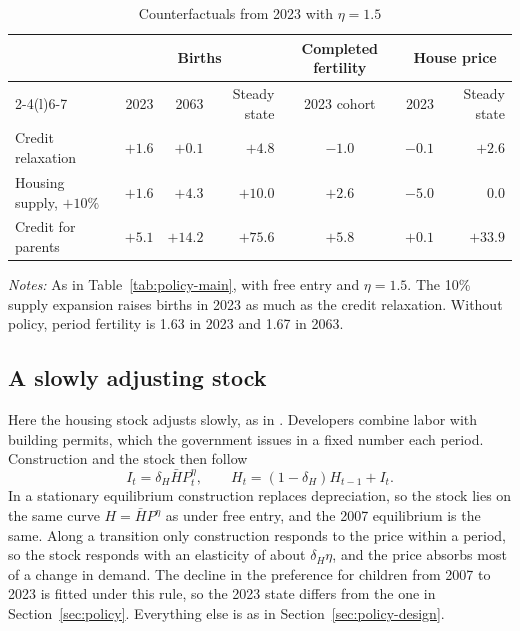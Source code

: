 \begin{table}[H]
\centering
\caption{Counterfactuals from 2023 with $\eta=1.5$}
\label{tab:app-policy-eta}
\small
\begin{tabularx}{\textwidth}{@{}Xrrrcrr@{}}
\toprule
 & \multicolumn{3}{c}{Births} & Completed fertility & \multicolumn{2}{c}{House price} \\
\cmidrule(lr){2-4}\cmidrule(l){6-7}
 & 2023 & 2063 & Steady state & 2023 cohort & 2023 & Steady state \\
\midrule
Credit relaxation & $+1.6$ & $+0.1$ & $+4.8$ & $-1.0$ & $-0.1$ & $+2.6$ \\
Housing supply, $+10\%$ & $+1.6$ & $+4.3$ & $+10.0$ & $+2.6$ & $-5.0$ & $0.0$ \\
Credit for parents & $+5.1$ & $+14.2$ & $+75.6$ & $+5.8$ & $+0.1$ & $+33.9$ \\
\bottomrule
\end{tabularx}
\par\smallskip
\begin{minipage}{0.95\linewidth}
\footnotesize\textit{Notes:} As in Table~\ref{tab:policy-main}, with free
entry and $\eta=1.5$. The 10\% supply expansion raises births in 2023 as much
as the credit relaxation. Without policy, period fertility is 1.63 in 2023 and 1.67
in 2063.
\end{minipage}
\end{table}

\subsection{A slowly adjusting stock}
\label{app:policy-slow}

Here the housing stock adjusts slowly, as in
\citet{kaplanMitmanViolanteHousing2020}. Developers combine labor with building permits, which the government issues
in a fixed number each period. Construction and the stock then follow
\begin{equation}
 I_t=\delta_H \bar HP_t^{\eta},\qquad H_t=(1-\delta_H)H_{t-1}+I_t .
 \label{eq:app-slow-stock}
\end{equation}
In a stationary equilibrium construction replaces depreciation, so the stock
lies on the same curve $H=\bar HP^{\eta}$ as under free entry, and the 2007
equilibrium is the same. Along a transition only construction responds to the
price within a period, so the stock responds with an elasticity of about
$\delta_H\eta$, and the price absorbs most of a change in demand. The decline
in the preference for children from 2007 to 2023 is fitted under this rule, so
the 2023 state differs from the one in Section~\ref{sec:policy}. Everything
else is as in Section~\ref{sec:policy-design}.


